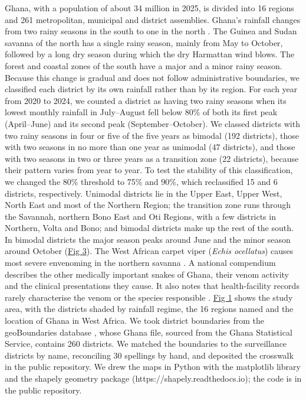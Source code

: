 \documentclass[11pt,a4paper]{article}
\begin{document}
Ghana, with a population of about 34 million in 2025, is divided into 16 regions and 261 metropolitan, municipal and district assemblies. Ghana's rainfall changes from two rainy seasons in the south to one in the north \cite{ref14}. The Guinea and Sudan savanna of the north has a single rainy season, mainly from May to October, followed by a long dry season during which the dry Harmattan wind blows. The forest and coastal zones of the south have a major and a minor rainy season. Because this change is gradual and does not follow administrative boundaries, we classified each district by its own rainfall rather than by its region. For each year from 2020 to 2024, we counted a district as having two rainy seasons when its lowest monthly rainfall in July--August fell below 80\% of both its first peak (April--June) and its second peak (September--October). We classed districts with two rainy seasons in four or five of the five years as bimodal (192 districts), those with two seasons in no more than one year as unimodal (47 districts), and those with two seasons in two or three years as a transition zone (22 districts), because their pattern varies from year to year. To test the stability of this classification, we changed the 80\% threshold to 75\% and 90\%, which reclassified 15 and 6 districts, respectively. Unimodal districts lie in the Upper East, Upper West, North East and most of the Northern Region; the transition zone runs through the Savannah, northern Bono East and Oti Regions, with a few districts in Northern, Volta and Bono; and bimodal districts make up the rest of the south. In bimodal districts the major season peaks around June and the minor season around October (\hyperref[fig3]{Fig 3}). The West African carpet viper (\emph{Echis ocellatus}) causes most severe envenoming in the northern savanna \cite{ref6}. A national compendium describes the other medically important snakes of Ghana, their venom activity and the clinical presentations they cause. It also notes that health-facility records rarely characterise the venom or the species responsible \cite{ref15}. \hyperref[fig1]{Fig 1} shows the study area, with the districts shaded by rainfall regime, the 16 regions named and the location of Ghana in West Africa. We took district boundaries from the geoBoundaries database \cite{ref16}, whose Ghana file, sourced from the Ghana Statistical Service, contains 260 districts. We matched the boundaries to the surveillance districts by name, reconciling 30 spellings by hand, and deposited the crosswalk in the public repository. We drew the maps in Python with the matplotlib library \cite{ref17} and the shapely geometry package (https://shapely.readthedocs.io); the code is in the public repository.
\end{document}
